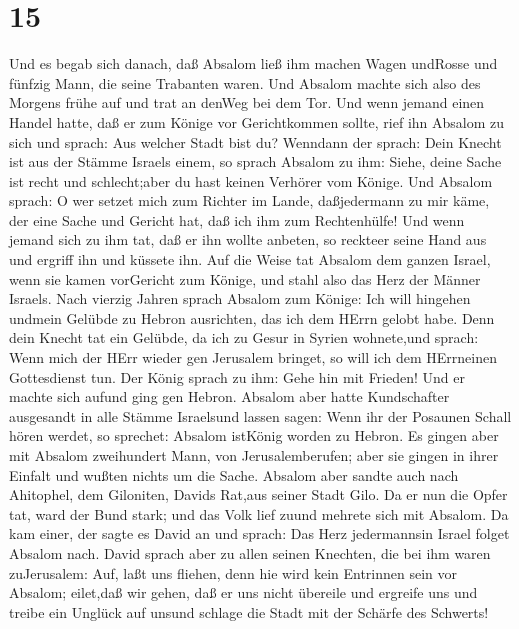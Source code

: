 \hypertarget{section-14}{%
\section{15}\label{section-14}}

 Und es begab sich danach, daß Absalom ließ ihm machen Wagen
undRosse und fünfzig Mann, die seine Trabanten waren.  Und
Absalom machte sich also des Morgens frühe auf und trat an denWeg bei
dem Tor. Und wenn jemand einen Handel hatte, daß er zum Könige vor
Gerichtkommen sollte, rief ihn Absalom zu sich und sprach: Aus welcher
Stadt bist du? Wenndann der sprach: Dein Knecht ist aus der Stämme
Israels einem,  so sprach Absalom zu ihm: Siehe, deine Sache
ist recht und schlecht;aber du hast keinen Verhörer vom Könige.
 Und Absalom sprach: O wer setzet mich zum Richter im Lande,
daßjedermann zu mir käme, der eine Sache und Gericht hat, daß ich ihm
zum Rechtenhülfe!  Und wenn jemand sich zu ihm tat, daß er
ihn wollte anbeten, so reckteer seine Hand aus und ergriff ihn und
küssete ihn.  Auf die Weise tat Absalom dem ganzen Israel,
wenn sie kamen vorGericht zum Könige, und stahl also das Herz der Männer
Israels.  Nach vierzig Jahren sprach Absalom zum Könige: Ich
will hingehen undmein Gelübde zu Hebron ausrichten, das ich dem HErrn
gelobt habe.  Denn dein Knecht tat ein Gelübde, da ich zu
Gesur in Syrien wohnete,und sprach: Wenn mich der HErr wieder gen
Jerusalem bringet, so will ich dem HErrneinen Gottesdienst tun.
 Der König sprach zu ihm: Gehe hin mit Frieden! Und er
machte sich aufund ging gen Hebron.  Absalom aber hatte
Kundschafter ausgesandt in alle Stämme Israelsund lassen sagen: Wenn ihr
der Posaunen Schall hören werdet, so sprechet: Absalom istKönig worden
zu Hebron.  Es gingen aber mit Absalom zweihundert Mann,
von Jerusalemberufen; aber sie gingen in ihrer Einfalt und wußten nichts
um die Sache.  Absalom aber sandte auch nach Ahitophel, dem
Giloniten, Davids Rat,aus seiner Stadt Gilo. Da er nun die Opfer tat,
ward der Bund stark; und das Volk lief zuund mehrete sich mit Absalom.
 Da kam einer, der sagte es David an und sprach: Das Herz
jedermannsin Israel folget Absalom nach.  David sprach aber
zu allen seinen Knechten, die bei ihm waren zuJerusalem: Auf, laßt uns
fliehen, denn hie wird kein Entrinnen sein vor Absalom; eilet,daß wir
gehen, daß er uns nicht übereile und ergreife uns und treibe ein Unglück
auf unsund schlage die Stadt mit der Schärfe des Schwerts! 
